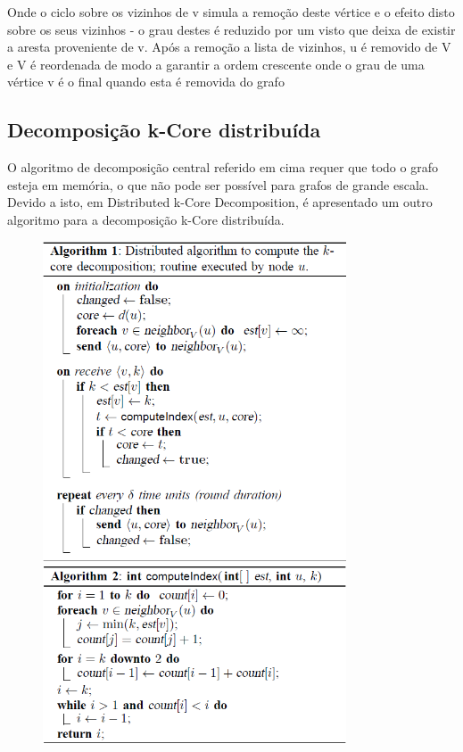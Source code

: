 \documentclass[a4paper,10pt]{report}
\begin{document}
Onde o ciclo sobre os vizinhos de v simula a remoção deste vértice e o efeito disto sobre os seus vizinhos - o grau destes é reduzido por um visto que deixa de existir a aresta proveniente de v.
Após a remoção a lista de vizinhos, u é removido de V e V é reordenada de modo a garantir a ordem crescente onde o grau de uma vértice v é o final quando esta é removida do grafo 


\subsection*{Decomposição k-Core distribuída}
O algoritmo de decomposição central referido em cima requer que todo o grafo esteja em memória, o que não pode ser possível para grafos de grande escala. Devido a isto, em Distributed k-Core Decomposition, é apresentado um outro algoritmo para a decomposição k-Core distribuída.


\begin{figure}[ht!]
\includegraphics[width=90mm]{Algorithm1}
\includegraphics[width=90mm]{Algorithm2}
\label{overflow}
\end{figure}


\end{document}
